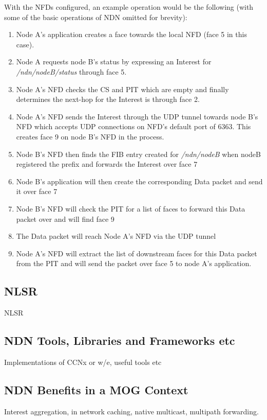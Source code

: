 With the NFDs configured, an example operation would be the following (with some of the basic operations of NDN omitted for brevity):

\begin{enumerate}
    \item Node A's application creates a face towards the local NFD (face 5 in this case).
    \item Node A requests node B's status by expressing an Interest for \textit{/ndn/nodeB/status} through face 5.
    \item Node A's NFD checks the CS and PIT which are empty and finally determines the next-hop for the Interest is through face 2.
    \item Node A's NFD sends the Interest through the UDP tunnel towards node B's NFD which accepts UDP connections on NFD's default port of 6363. This creates face 9 on node B's NFD in the process.
    \item Node B's NFD then finds the FIB entry created for \textit{/ndn/nodeB} when nodeB registered the prefix and forwards the Interest over face 7
    \item Node B's application will then create the corresponding Data packet and send it over face 7
    \item Node B's NFD will check the PIT for a list of faces to forward this Data packet over and will find face 9
    \item The Data packet will reach Node A's NFD via the UDP tunnel
    \item Node A's NFD will extract the list of downstream faces for this Data packet from the PIT and will send the packet over face 5 to node A's application.
\end{enumerate}



\subsection{NLSR}\label{sec:NLSR}
NLSR

\subsection{NDN Tools, Libraries and Frameworks etc}\label{sec:ndn-tools}
Implementations of CCNx or w/e, useful tools etc

\subsection{NDN Benefits in a MOG Context}
Interest aggregation, in network caching, native multicast, multipath forwarding.



